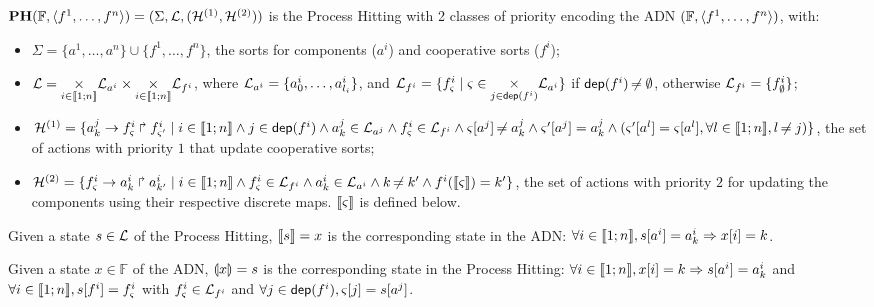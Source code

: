 \begin{definition}
\label{def:DN2PH}
  $\mathbf{PH}(\mathbb F, \langle f^1, \dots, f^n\rangle)=(\Sigma,\mathcal{L},(\mathcal{H}^{(1)},\mathcal{H}^{(2)}))$ is the Process Hitting with 2 classes of priority encoding the
  ADN $(\mathbb F, \langle f^1, \dots, f^n\rangle)$, with:
  \begin{itemize}
    \item $\Sigma = \{ a^1, \dots, a^n \} \cup \{ f^1, \dots, f^n \}$,
      the sorts for components ($a^i$) and cooperative sorts ($f^i$);

    \item $\mathcal{L}=\underset{i\in\llbracket 1; n \rrbracket}{\times} \mathcal{L}_{a^i} \times \underset{i\in\llbracket 1; n \rrbracket}{\times} \mathcal{L}_{f^i}$, where
      $\mathcal{L}_{a^i}=\{a^i_0, \dots, a^i_{l_i}\}$, and
      $\mathcal{L}_{f^i}=\{f^i_\varsigma \mid \varsigma\in\underset{j\in\mathsf{dep}(f^i)}{\times} \mathcal{L}_{a^i} \}$
      if $\mathsf{dep}(f^i)\not\nobreak\mkern -2mu =\emptyset$, otherwise
      $\mathcal{L}_{f^i}=\{f^i_\emptyset\}$;
      
    \item $\mathcal{H}^{(1)}= \{ a^j_k\rightarrow f^i_\varsigma\Rsh f^i_{\varsigma'}
      \mid i\in\llbracket 1; n \rrbracket \wedge
      j\in\mathsf{dep}(f^i) \wedge a^j_k\in \mathcal{L}_{a^j} \wedge f^i_\varsigma\in \mathcal{L}_{f^i}
      \wedge
      \varsigma[{a^j}]\not\nobreak\mkern -2mu = a^j_k 
      \wedge \varsigma'[{a^j}]=a^j_k
      \wedge (\varsigma'[{a^{l}}]=\varsigma[{a^l}],
      \forall l\in\llbracket 1; n \rrbracket,l\not\nobreak\mkern -2mu = j)
      \}$, 
      the set of actions with priority $1$ that update cooperative sorts;

    \item $\mathcal{H}^{(2)}=\{ f^i_\varsigma\rightarrow a^i_k\Rsh a^i_{k'} \mid i\in\llbracket 1; n \rrbracket \wedge
          f^i_\varsigma\in \mathcal{L}_{f^i} \wedge
          a^i_k\in \mathcal{L}_{a^i}\wedge k\not\nobreak\mkern -2mu = k' \wedge f^i(\llbracket\varsigma\rrbracket) = k'
        \}$,
      the set of actions with priority $2$ for updating the components using their respective discrete
      maps.
      $\llbracket\varsigma\rrbracket$ is defined below.
  \end{itemize}
  Given a state $s\in \mathcal{L}$ of the Process Hitting, 
  $\llbracket s\rrbracket=x$ is the corresponding state in the ADN:
  $\forall i\in\llbracket 1; n \rrbracket, s[{a^i}]=a^i_k \Rightarrow x[{i}]=k$.

  \noindent
  Given a state $x\in \mathbb F$ of the ADN, 
  $\llparenthesis x\rrparenthesis=s$ is the corresponding state in the Process Hitting:
  $\forall i\in\llbracket 1; n \rrbracket, x[{i}]=k \Rightarrow s[{a^i}]=a^i_k$
  and
  $\forall i\in\llbracket 1; n \rrbracket, s[{f^i}]=f^i_\varsigma$ with $f^i_\varsigma\in \mathcal{L}_{f^i}$
  and $\forall j\in\mathsf{dep}(f^i), \varsigma[{j}]=s[{a^j}]$.
\end{definition}

